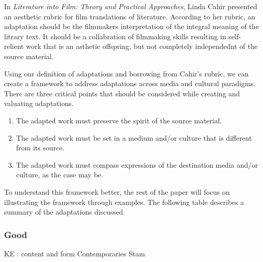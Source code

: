 \documentclass[12pt]{article}
\begin{document}
In \textit{Literature into Film: Theory and Practical Approaches}, Linda Cahir 
presented an aesthetic rubric for film translations of literature. According to
her rubric, an adaptation should be the filmmakers interpretation of the integral 
meaning of the litrary text. It should be a collabration of filmmaking skills
resulting in self-relient work that is an asthetic offspring, but not completely
independednt of the source material.


Using our definition of adaptations and borrowing from Cahir's rubric, we can
create a framework to address adaptations across media and cultural paradigms. 
There are three critical points that should be considered while creating and
valuating adaptations. 

\begin{enumerate}
\item The adapted work must preserve the spirit of the source material.
\item The adapted work must be set in a medium and/or culture that is different
from its source.
\item The adapted work must compass expressions of the destination media and/or
culture, as the case may be.
\end{enumerate}

To understand this framework better, the rest of the paper will focus on
illustrating the framework through examples.
The following table describes a summary of the adaptations discussed.

\pagebreak
\subsubsection*{Good}
\pagebreak
KE : content and form
Contemporaries 
Stam 
\end{document}
